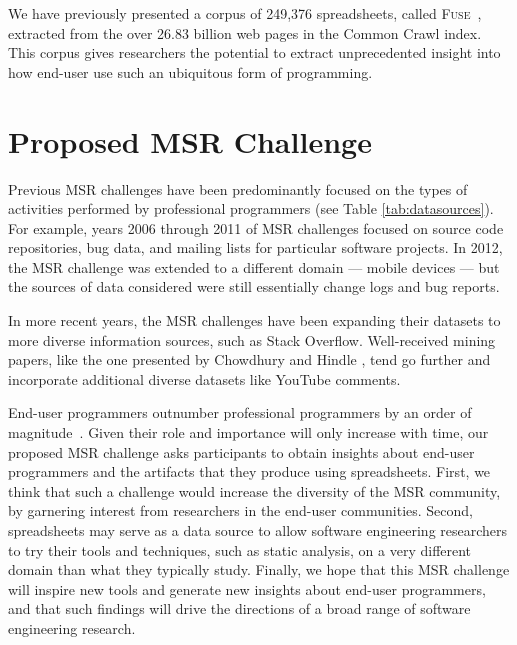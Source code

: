 \documentclass[conference]{IEEEtran}
\begin{document}
We have previously presented a corpus of 249,376 spreadsheets, called \textsc{Fuse}~\cite{barik2015}, extracted from the over 26.83 billion web pages in the Common Crawl index.
This corpus gives researchers the potential to extract unprecedented insight into how end-user use such an ubiquitous form of programming.


\section{Proposed MSR Challenge}
Previous MSR challenges have been predominantly focused on the types of activities performed by professional programmers (see Table \ref{tab:datasources}). 
For example, years 2006 through 2011 of MSR challenges focused on source code repositories, bug data, and mailing lists for particular software projects. 
In 2012, the MSR challenge was extended to a different domain --- mobile devices --- but the sources of data considered were still essentially change logs and bug reports. 

In more recent years, the MSR challenges have been expanding their datasets to more diverse information sources, such as Stack Overflow.
Well-received mining papers, like the one presented by Chowdhury and Hindle \cite{chowdhury2015}, tend go further and incorporate additional diverse datasets like YouTube comments.

End-user programmers outnumber professional programmers by an order of magnitude~\cite{Scaffidi2005}.
Given their role and importance will only increase with time, our proposed MSR challenge asks participants to obtain insights about end-user programmers and the artifacts that they produce using spreadsheets. 
%
First, we think that such a challenge would increase the diversity of the MSR community, by garnering interest from researchers in the end-user communities. 
Second, spreadsheets may serve as a data source to allow software engineering researchers to try their tools and techniques, such as static analysis, on a very different domain than what they typically study. 
Finally, we hope that this MSR challenge will inspire new tools and generate new insights about end-user programmers, and that such findings will drive the directions of a broad range of software engineering research.
\end{document}
